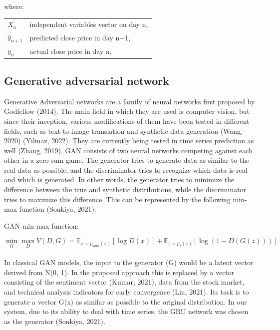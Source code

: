 \documentclass[11pt]{article} %
\makeatletter
\newenvironment{conditions}
  {\par\vspace{\abovedisplayskip}\noindent\begin{tabular}{>{$}l<{$} @{${}={}$} l}}
  {\end{tabular}\par\vspace{\belowdisplayskip}}
\makeatother
\begin{document}
where:
\begin{conditions}
X_n & independent variables vector on day n, \\ 
 \hat{y}_{n+1}     &   predicted close price in day n+1,\\
 y_{n}     &  actual close price  in day n,\\   
\end{conditions}

\subsection{Generative adversarial network}

Generative Adversarial networks are a family of neural networks first proposed by Godfellow (2014). The main field in which they are used is computer vision, but since their inception, various modifications of them have been tested in different fields, such as text-to-image translation and synthetic data generation (Wang, 2020) (Yilmaz, 2022). They are currently being tested in time series prediction as well (Zhang, 2019).  GAN consists of two neural networks competing against each other in a zero-sum game. The generator tries to generate data as similar to the real data as possible, and the discriminator tries to recognize which data is real and which is generated. In other words, the generator tries to minimize the difference between the true and synthetic distributions, while the discriminator tries to maximize this difference. This can be represented by the following min-max function (Sonkiya, 2021): 

\begin{center}   GAN min-max function: \end{center}
\begin{equation} \min_G \max_D V(D, G)=
\mathbb{E}_{x\sim p_{data}(x)}[\log D(x)]
+ \mathbb{E}_{z\sim p_z(z)}[\log(1 - D(G(z)))] \end{equation}\\

In classical GAN models, the input to the generator (G) would be a latent vector derived from N(0, 1). In the proposed approach this is replaced by a vector consisting of the sentiment vector (Kumar, 2021), data from the stock market, and technical analysis indicators for early convergence (Lin, 2021). Its task is to generate a vector G(x) as similar as possible to the original distribution. In our system, due to its ability to deal with time series, the GRU network was chosen as the generator (Sonkiya, 2021). 
\end{document}
